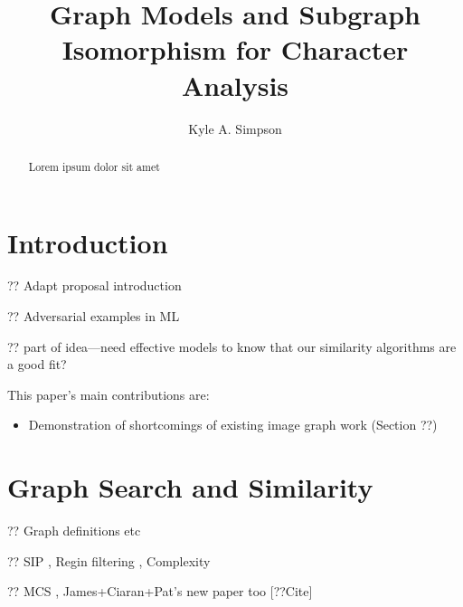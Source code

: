 \documentclass{mpaper}
\begin{document}
\title{Graph Models and Subgraph Isomorphism for Character Analysis}
\author{Kyle A. Simpson}

\maketitle
\begin{abstract}
Lorem ipsum dolor sit amet
\end{abstract}

\section{Introduction}
\label{sec:introduction}

?? Adapt proposal introduction

?? Adversarial examples in ML \cite{AdversarialML}

?? part of idea---need effective models to know that our similarity algorithms are a good fit?


This paper's main contributions are:
\begin{itemize}
\item Demonstration of shortcomings of existing image graph work (Section ??)
\end{itemize}

\section{Graph Search and Similarity}
\label{sec:graph-search}

?? Graph definitions etc

?? SIP \cite{SIP-VF2, SIP-LAD, SIP-SND, SIP-Glasgow}, Regin filtering \cite{AllDiff}, Complexity \cite{Cook-SAT-SIP-NP,Computers-and-Intractibility}

?? MCS \cite{Between-MCS-SIP}, James+Ciaran+Pat's new paper too [??Cite]
\end{document}

